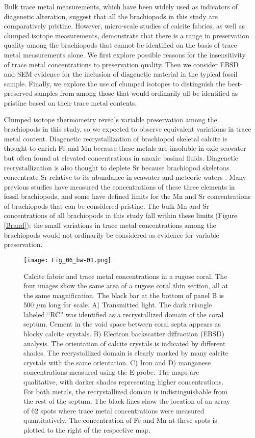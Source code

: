 \documentclass[5p, authoryear]{elsarticle}
\begin{document}
Bulk trace metal measurements, which have been widely used as indicators of diagenetic alteration, suggest that all the brachiopods in this study are comparatively pristine. However, micro-scale studies of calcite fabrics, as well as clumped isotope measurements, demonstrate that there is a range in preservation quality among the brachiopods that cannot be identified on the basis of trace metal measurements alone. We first explore possible reasons for the insensitivity of trace metal concentrations to preservation quality. Then we consider EBSD and SEM evidence for the inclusion of diagenetic material in the typical fossil sample. Finally, we explore the use of clumped isotopes to distinguish the best-preserved samples from among those that would ordinarily all be identified as pristine based on their trace metal contents.  

Clumped isotope thermometry reveals variable preservation among the brachiopods in this study, so we expected to observe equivalent variations in trace metal content. Diagenetic recrystallization of brachiopod skeletal calcite is thought to enrich Fe and Mn because these metals are insoluble in oxic seawater but often found at elevated concentrations in anoxic basinal fluids. Diagenetic recrystallization is also thought to deplete Sr because brachiopod skeletons concentrate Sr relative to its abundance in seawater and meteoric waters \citep{Brand1980, Shields2003}. Many previous studies have measured the concentrations of these three elements in fossil brachiopods, and some have defined limits for the Mn and Sr concentrations of brachiopods that can be considered pristine. The bulk Mn and Sr concentrations of all brachiopods in this study fall within these limits (Figure \ref{Brand}); the small variations in trace metal concentrations among the brachiopods would not ordinarily be considered as evidence for variable preservation. 

\begin{figure*}[tb]
\centering
\texttt{[image: Fig\_06\_bw-01.png]}
\caption{Calcite fabric and trace metal concentrations in a rugose coral. The four images show the same area of a rugose coral thin section, all at the same magnification. The black bar at the bottom of panel B is 500 $\mu$m long for scale. A) Transmitted light. The dark triangle labeled ``RC'' was identified as a recrystallized domain of the coral septum. Cement in the void space between coral septa appears as blocky calcite crystals. B) Electron backscatter diffraction (EBSD) analysis. The orientation of calcite crystals is indicated by different shades. The recrystallized domain is clearly marked by many calcite crystals with the same orientation. C) Iron and D) manganese concentrations measured using the E-probe. The maps are qualitative, with darker shades representing higher concentrations. For both metals, the recrystallized domain is indistinguishable from the rest of the septum. The black lines show the location of an array of 62 spots where trace metal concentrations were measured quantitatively. The concentration of Fe and Mn at these spots is plotted to the right of the respective map.}
\label{EBSD_coral}
\end{figure*}
\end{document}
